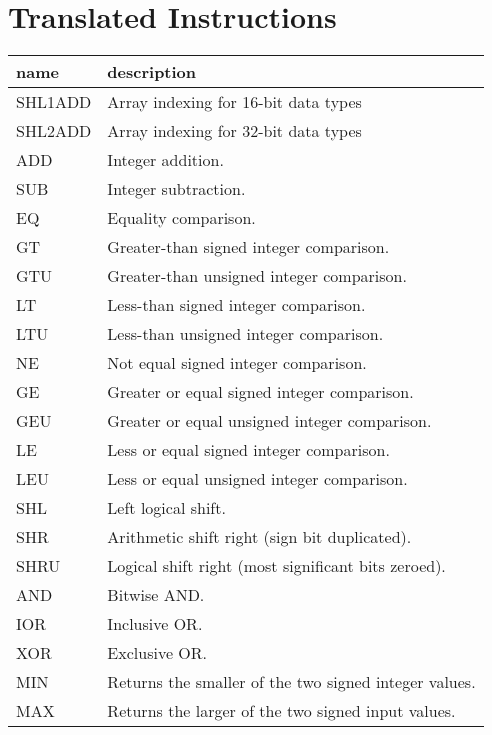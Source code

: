 \section{Translated Instructions}

\begin{table}[!ht]
    \small
    \centering
    \begin{tabularx}{\textwidth}{|l|X|}
    \hline
    \textbf{name} & \textbf{description} \\ \hline
    SHL1ADD & Array indexing for 16-bit data types \\ \hline
    SHL2ADD & Array indexing for 32-bit data types \\ \hline
    ADD & Integer addition.  \\ \hline
    SUB & Integer subtraction.  \\ \hline
    EQ & Equality comparison.  \\ \hline
    GT & Greater-than signed integer comparison.  \\ \hline
    GTU & Greater-than unsigned integer comparison.  \\ \hline
    LT & Less-than signed integer comparison. \\ \hline
    LTU & Less-than unsigned integer comparison. \\ \hline
    NE & Not equal signed integer comparison. \\ \hline
    GE & Greater or equal signed integer comparison. \\ \hline
    GEU & Greater or equal unsigned integer comparison. \\ \hline
    LE & Less or equal signed integer comparison. \\ \hline
    LEU & Less or equal unsigned integer comparison. \\ \hline
    SHL & Left logical shift. \\ \hline
    SHR & Arithmetic shift right (sign bit duplicated). \\ \hline
    SHRU & Logical shift right (most significant bits zeroed). \\ \hline
    AND & Bitwise AND.  \\ \hline
    IOR & Inclusive OR.  \\ \hline
    XOR & Exclusive OR.  \\ \hline
    MIN & Returns the smaller of the two signed integer values.  \\ \hline
    MAX & Returns the larger of the two signed input values.  \\ \hline

\end{tabularx}
\end{table}
